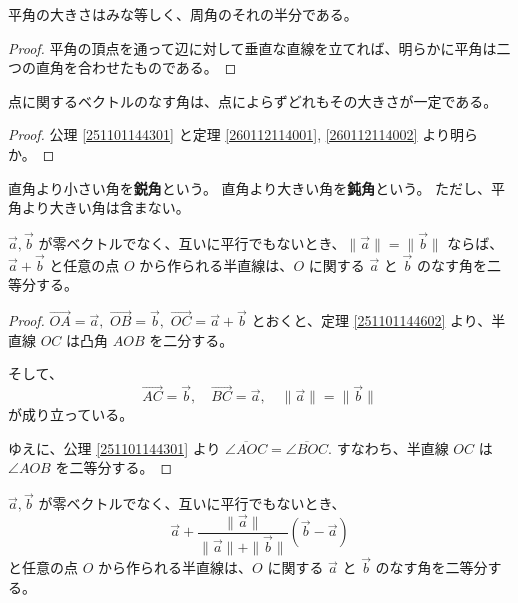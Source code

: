 \begin{thm}\label{260112114002}
  平角の大きさはみな等しく、周角のそれの半分である。
\end{thm}

\begin{proof}
  平角の頂点を通って辺に対して垂直な直線を立てれば、明らかに平角は二つの直角を合わせたものである。
\end{proof}

\begin{thm}
  点に関するベクトルのなす角は、点によらずどれもその大きさが一定である。
\end{thm}

\begin{proof}
  公理 \ref{251101144301} と定理 \ref{260112114001}, \ref{260112114002} より明らか。
\end{proof}

\begin{dfn}[鋭角、鈍角]
  直角より小さい角を\textbf{鋭角}という。
  直角より大きい角を\textbf{鈍角}という。
  ただし、平角より大きい角は含まない。
\end{dfn}

\begin{lmm}\label{251101144701}
 \(\vec{a},\vec{b}\) が零ベクトルでなく、互いに平行でもないとき、\(\|\vec{a}\|=\|\vec{b}\|\) ならば、\(\vec{a}+\vec{b}\) と任意の点 \(O\) から作られる半直線は、\(O\) に関する \(\vec{a}\) と \(\vec{b}\) のなす角を二等分する。
\end{lmm}

\begin{proof}
  \(\overrightarrow{OA}=\vec{a},\) \(\overrightarrow{OB}=\vec{b},\) \(\overrightarrow{OC}=\vec{a}+\vec{b}\) とおくと、定理 \ref{251101144602} より、半直線 \(OC\) は凸角 \(AOB\) を二分する。

  そして、
  \[\overrightarrow{AC}=\vec{b},\quad \overrightarrow{BC}=\vec{a},\quad \|\vec{a}\|=\|\vec{b}\|\]
  が成り立っている。

  ゆえに、公理 \ref{251101144301} より \(\overline{\angle AOC}=\overline{\angle BOC}.\)
  すなわち、半直線 \(OC\) は \(\angle AOB\) を二等分する。
\end{proof}

\begin{lmm}\label{251101144802}
 \(\vec{a},\vec{b}\) が零ベクトルでなく、互いに平行でもないとき、
 \[\vec{a}+\frac{\|\vec{a}\|}{\|\vec{a}\|+\|\vec{b}\|}(\vec{b}-\vec{a})\]
 と任意の点 \(O\) から作られる半直線は、\(O\) に関する \(\vec{a}\) と \(\vec{b}\) のなす角を二等分する。
\end{lmm}

